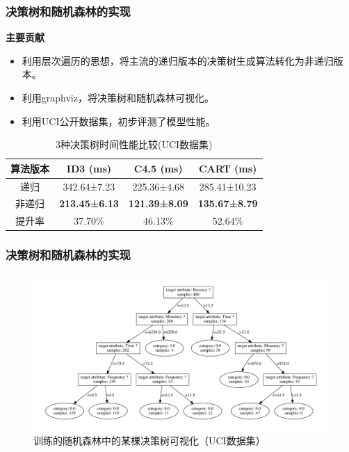 \documentclass[10pt,aspectratio=43,mathserif]{beamer}
\begin{document}
        \begin{frame}
		  \frametitle{\textbf{决策树和随机森林的实现}}
            \begin{block}{\textbf{主要贡献}}
                \begin{itemize}
                    \item 利用层次遍历的思想，将主流的递归版本的决策树生成算法转化为非递归版本。
                    \item 利用graphviz，将决策树和随机森林可视化。
                    \item 利用UCI公开数据集，初步评测了模型性能。
                \end{itemize}
            \end{block}

            \begin{table}[]
                \caption{3种决策树时间性能比较(UCI数据集)}
                \label{dt_time_compare}
                \centering
                \begin{tabular}{cccc}
                \hline
                算法版本 & ID3 (ms)             & C4.5 (ms)            & CART (ms)            \\ \hline
                递归   & 342.64±7.23          & 225.36±4.68          & 285.41±10.23         \\
                非递归  & \textbf{213.45±6.13} & \textbf{121.39±8.09} & \textbf{135.67±8.79} \\ \hline
                提升率  & 37.70\%              & 46.13\%              & 52.64\%              \\ \hline
                \end{tabular}
            \end{table}

        \end{frame}
        
        \begin{frame}
		  \frametitle{\textbf{决策树和随机森林的实现}}
          \begin{figure}[!t]
            \centering
            \includegraphics[width=1.1\textwidth]{figures/test_3_random_decision_tree_0.pdf}
            \caption{训练的随机森林中的某棵决策树可视化（UCI数据集）}
        \end{figure}
		\end{frame}
\end{document}
